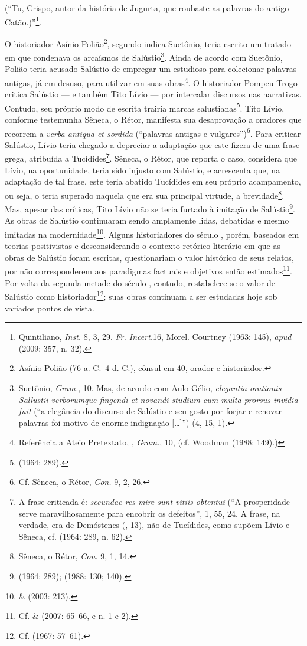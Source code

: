 (“Tu, Crispo,
autor da história de Jugurta, que roubaste as palavras do antigo
Catão.)”\footnote{Quintiliano, \emph{Inst.} 8, 3, 29. \emph{Fr. Incert.}16, Morel. Courtney
(1963: 145), \emph{apud } (2009: 357, n. 32).}.

O historiador Asínio Polião\footnote{Asínio Polião (76 a. C.--4 d. C.), cônsul
em 40, orador e historiador.}, segundo indica Suetônio, teria escrito um
tratado em que condenava os arcaísmos de Salústio\footnote{Suetônio, \emph{Gram.}, 10. Mas, de acordo com Aulo Gélio,  \emph{elegantia orationis
Sallustii verborumque fingendi et novandi studium cum multa prorsus invidia
fuit} (“a elegância do discurso de Salústio e seu gosto por forjar e renovar
palavras foi motivo de enorme indignação [\ldots{}]”) (4, 15,
1).}. Ainda de acordo com Suetônio, Polião teria acusado Salústio de empregar
um estudioso para colecionar palavras antigas, já em desuso, para utilizar em
suas obras\footnote{ Referência a Ateio Pretextato, , \emph{Gram.}, 10, (cf. Woodman (1988: 149).)}.  O historiador Pompeu Trogo critica Salústio ---
e também Tito Lívio --- por intercalar discursos nas narrativas. Contudo, seu
próprio modo de escrita trairia marcas salustianas\footnote{ (1964: 289).}. Tito Lívio, conforme testemunha Sêneca, o Rétor, manifesta sua
desaprovação a oradores que recorrem a \emph{verba antiqua et sordida}
(``palavras antigas e vulgares'')\footnote{ Cf. Sêneca, o Rétor, \emph{Con.}
9, 2, 26.}. Para criticar Salústio, Lívio teria chegado a depreciar a adaptação
que este fizera de uma frase grega, atribuída a Tucídides\footnote{A frase
criticada é: \emph{secundae res mire sunt vitiis obtentui} (“A prosperidade
serve maravilhosamente para encobrir os defeitos”, 1, 55, 24.
A frase, na verdade, era de Demóstenes  (, 13), não de Tucídides, como supõem
Lívio e Sêneca, cf.  (1964: 289, n. 62).}.  Sêneca, o Rétor, que reporta
o caso, considera que Lívio, na oportunidade, teria sido injusto com Salústio,
e acrescenta que, na adaptação de tal frase, este teria abatido Tucídides em
seu próprio acampamento, ou seja, o teria superado naquela que era sua
principal virtude, a brevidade\footnote{Sêneca, o Rétor,  \emph{Con.} 9, 1,
14.}. Mas, apesar das críticas, Tito Lívio não se teria furtado à imitação de
Salústio\footnote{ (1964: 289);  (1988: 130; 140).}.  As
obras de Salústio continuaram sendo amplamente lidas, debatidas e mesmo
imitadas na modernidade\footnote{  \&  (2003: 213).}. Alguns
historiadores do século , porém, baseados em teorias positivistas e
desconsiderando o contexto retórico-literário em que as obras de Salústio foram
escritas, questionariam o valor histórico de seus relatos, por não
corresponderem aos paradigmas factuais e objetivos então estimados\footnote{Cf.  \&  (2007: 65--66, e n. 1 e 2).}.  Por volta da segunda
  metade do século , contudo, restabelece-se o valor de Salústio
  como historiador\footnote{Cf.  (1967: 57--61).}; suas obras
  continuam a ser estudadas hoje sob variados pontos de vista.


